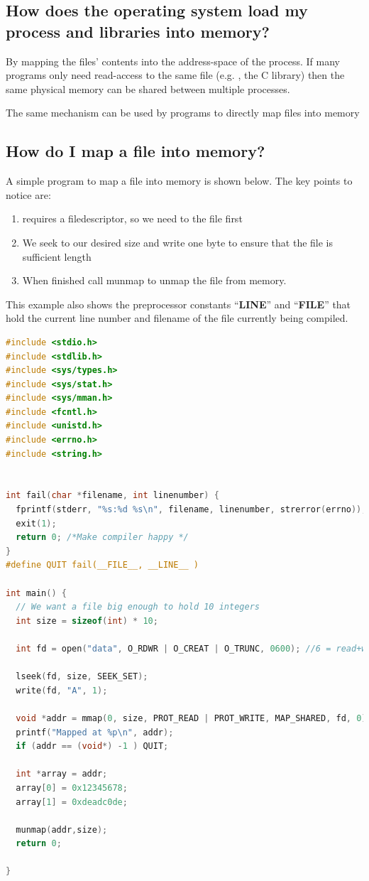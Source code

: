 \subsection{How does the operating system load my process and libraries into memory?}

By mapping the files' contents into the address-space of the process. If many programs only need read-access to the same file (e.g. , the C library) then the same physical memory can be shared between multiple processes.

The same mechanism can be used by programs to directly map files into memory

\subsection{How do I map a file into memory?}\label{how-do-i-map-a-file-into-memory}

A simple program to map a file into memory is shown below. The key points to notice are: 

\begin{enumerate}
\item {} requires a filedescriptor, so we need to  the file first 
\item We seek to our desired size and write one byte to ensure that the file is sufficient length 
\item When finished call munmap to unmap the file from memory.
\end{enumerate}

This example also shows the preprocessor constants ``\textbf{LINE}'' and ``\textbf{FILE}'' that hold the current line number and filename of the file currently being compiled.

\begin{lstlisting}[language=C]
#include <stdio.h>
#include <stdlib.h>
#include <sys/types.h>
#include <sys/stat.h>
#include <sys/mman.h>
#include <fcntl.h>
#include <unistd.h>
#include <errno.h>
#include <string.h>


int fail(char *filename, int linenumber) { 
  fprintf(stderr, "%s:%d %s\n", filename, linenumber, strerror(errno)); 
  exit(1);
  return 0; /*Make compiler happy */
}
#define QUIT fail(__FILE__, __LINE__ )

int main() {
  // We want a file big enough to hold 10 integers  
  int size = sizeof(int) * 10;

  int fd = open("data", O_RDWR | O_CREAT | O_TRUNC, 0600); //6 = read+write for me!

  lseek(fd, size, SEEK_SET);
  write(fd, "A", 1);
  
  void *addr = mmap(0, size, PROT_READ | PROT_WRITE, MAP_SHARED, fd, 0);
  printf("Mapped at %p\n", addr);
  if (addr == (void*) -1 ) QUIT;
  
  int *array = addr;
  array[0] = 0x12345678;
  array[1] = 0xdeadc0de;

  munmap(addr,size);
  return 0;
  
}
\end{lstlisting}

